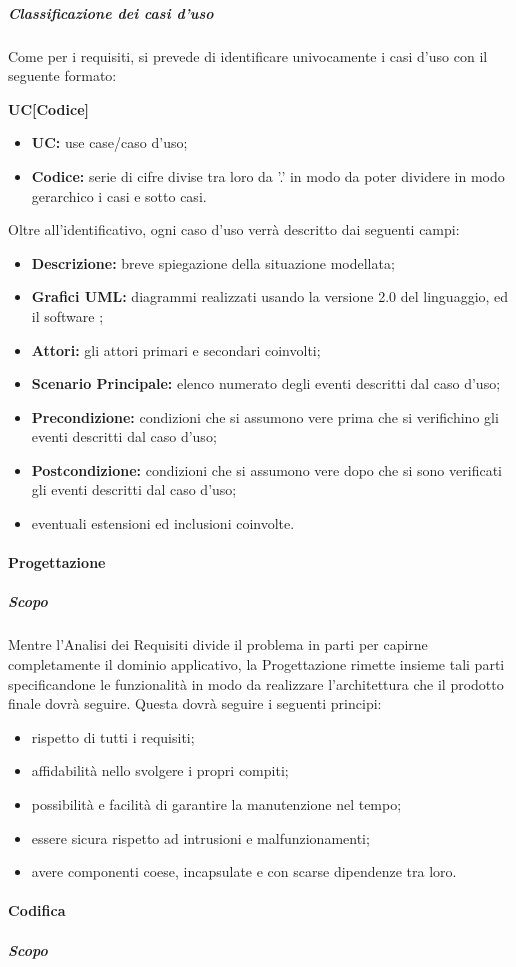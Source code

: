\documentclass[]{article}
\begin{document}
						\subparagraph{Classificazione dei casi d'uso} %
						Come per i requisiti, si prevede di identificare univocamente i casi d'uso con il seguente formato:
						\begin{center}
							\textbf{UC[Codice]}
						\end{center}
						\begin{itemize}
							\item \textbf{UC:} use case/caso d'uso;
							\item \textbf{Codice:} serie di cifre divise tra loro da ’.’ in modo da poter dividere in modo gerarchico i casi e sotto casi.
						\end{itemize}
						Oltre all'identificativo, ogni caso d'uso verrà descritto dai seguenti campi:
						\begin{itemize}
							\item \textbf{Descrizione:} breve spiegazione della situazione modellata;
							\item \textbf{Grafici UML:} diagrammi realizzati usando la versione 2.0 del linguaggio, ed il software ;
							\item \textbf{Attori:} gli attori primari e secondari coinvolti;
							\item \textbf{Scenario Principale:} elenco numerato degli eventi descritti dal caso d'uso;
							\item \textbf{Precondizione:} condizioni che si assumono vere prima che si verifichino gli eventi descritti dal caso d'uso;
							\item \textbf{Postcondizione:} condizioni che si assumono vere dopo che si sono verificati gli eventi descritti dal caso d'uso;
							\item eventuali estensioni ed inclusioni coinvolte.
						\end{itemize}
					\paragraph{Progettazione} %
						\subparagraph{Scopo} %
						Mentre l'Analisi dei Requisiti divide il problema in parti per capirne completamente il dominio applicativo, la Progettazione rimette insieme tali parti specificandone le funzionalità in modo da realizzare l'architettura che il prodotto finale dovrà seguire. Questa dovrà seguire i seguenti principi:
						\begin{itemize}
							\item rispetto di tutti i requisiti;
							\item affidabilità nello svolgere i propri compiti;
							\item possibilità e facilità di garantire la manutenzione nel tempo;
							\item essere sicura rispetto ad intrusioni e malfunzionamenti;
							\item avere componenti coese, incapsulate e con scarse dipendenze tra loro.
						\end{itemize}
					\paragraph{Codifica} %
					\subparagraph{Scopo} %
\end{document}
